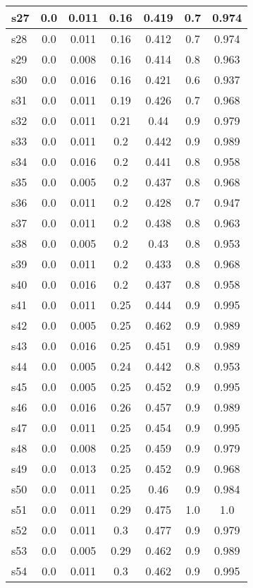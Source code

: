 \documentclass{article}
\begin{document}
\begin{tabular}{|l|c|c|c|c|c|c|}
\hline
s27 &0.0 & 0.011 & 0.16 & 0.419 & 0.7 & 0.974\\
\hline
s28 &0.0 & 0.011 & 0.16 & 0.412 & 0.7 & 0.974\\
\hline
s29 &0.0 & 0.008 & 0.16 & 0.414 & 0.8 & 0.963\\
\hline
s30 &0.0 & 0.016 & 0.16 & 0.421 & 0.6 & 0.937\\
\hline
s31 &0.0 & 0.011 & 0.19 & 0.426 & 0.7 & 0.968\\
\hline
s32 &0.0 & 0.011 & 0.21 & 0.44 & 0.9 & 0.979\\
\hline
s33 &0.0 & 0.011 & 0.2 & 0.442 & 0.9 & 0.989\\
\hline
s34 &0.0 & 0.016 & 0.2 & 0.441 & 0.8 & 0.958\\
\hline
s35 &0.0 & 0.005 & 0.2 & 0.437 & 0.8 & 0.968\\
\hline
s36 &0.0 & 0.011 & 0.2 & 0.428 & 0.7 & 0.947\\
\hline
s37 &0.0 & 0.011 & 0.2 & 0.438 & 0.8 & 0.963\\
\hline
s38 &0.0 & 0.005 & 0.2 & 0.43 & 0.8 & 0.953\\
\hline
s39 &0.0 & 0.011 & 0.2 & 0.433 & 0.8 & 0.968\\
\hline
s40 &0.0 & 0.016 & 0.2 & 0.437 & 0.8 & 0.958\\
\hline
s41 &0.0 & 0.011 & 0.25 & 0.444 & 0.9 & 0.995\\
\hline
s42 &0.0 & 0.005 & 0.25 & 0.462 & 0.9 & 0.989\\
\hline
s43 &0.0 & 0.016 & 0.25 & 0.451 & 0.9 & 0.989\\
\hline
s44 &0.0 & 0.005 & 0.24 & 0.442 & 0.8 & 0.953\\
\hline
s45 &0.0 & 0.005 & 0.25 & 0.452 & 0.9 & 0.995\\
\hline
s46 &0.0 & 0.016 & 0.26 & 0.457 & 0.9 & 0.989\\
\hline
s47 &0.0 & 0.011 & 0.25 & 0.454 & 0.9 & 0.995\\
\hline
s48 &0.0 & 0.008 & 0.25 & 0.459 & 0.9 & 0.979\\
\hline
s49 &0.0 & 0.013 & 0.25 & 0.452 & 0.9 & 0.968\\
\hline
s50 &0.0 & 0.011 & 0.25 & 0.46 & 0.9 & 0.984\\
\hline
s51 &0.0 & 0.011 & 0.29 & 0.475 & 1.0 & 1.0\\
\hline
s52 &0.0 & 0.011 & 0.3 & 0.477 & 0.9 & 0.979\\
\hline
s53 &0.0 & 0.005 & 0.29 & 0.462 & 0.9 & 0.989\\
\hline
s54 &0.0 & 0.011 & 0.3 & 0.462 & 0.9 & 0.995\\

\end{tabular}
\end{document}
